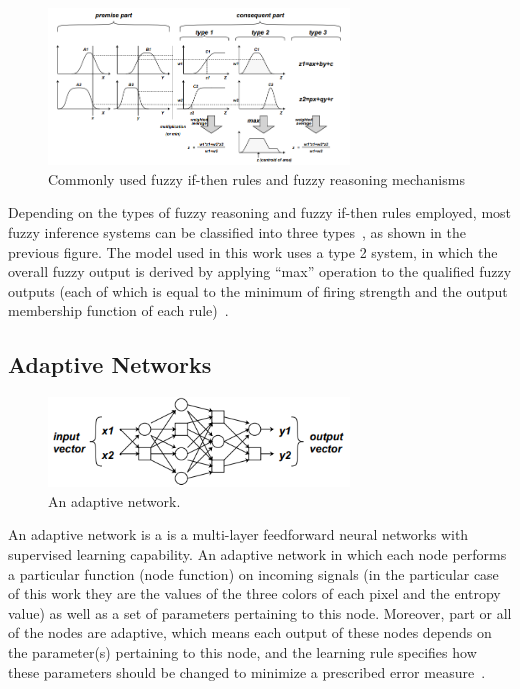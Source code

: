 \documentclass[10pt,twocolumn,letterpaper]{article}
\begin{document}
\begin{figure}[h]
\includegraphics[width=8cm]{images/commonUsed.PNG}
\caption{Commonly used fuzzy if-then rules and fuzzy reasoning mechanisms~\cite{jang} }
\end{figure}
Depending on the types of fuzzy reasoning and fuzzy if-then rules employed, most fuzzy inference systems can be classified into three types~\cite{jang}, as shown in the previous figure. The model used in this work uses a type 2 system, in which the overall fuzzy output is derived by applying “max” operation to the qualified fuzzy outputs (each of which is equal to the minimum of firing strength and the output membership function of each rule)~\cite{jang}.

\subsection{Adaptive Networks}

\begin{figure}[h]
\includegraphics[width=8cm]{images/adaptiveNet.PNG}
\caption{An adaptive network.}
\end{figure}
An adaptive network is a  is a multi-layer feedforward neural networks with supervised learning capability. An adaptive network in which each node performs a particular function (node function) on incoming signals (in the particular case of this work they are the values of the three colors of each pixel and the entropy value) as well as a set of parameters pertaining to this node. Moreover, part or all of the nodes are adaptive, which means each output of these nodes depends on the parameter(s) pertaining to this node, and the learning rule specifies how these parameters should be changed to minimize a prescribed error measure~\cite{jang}.
\end{document}
